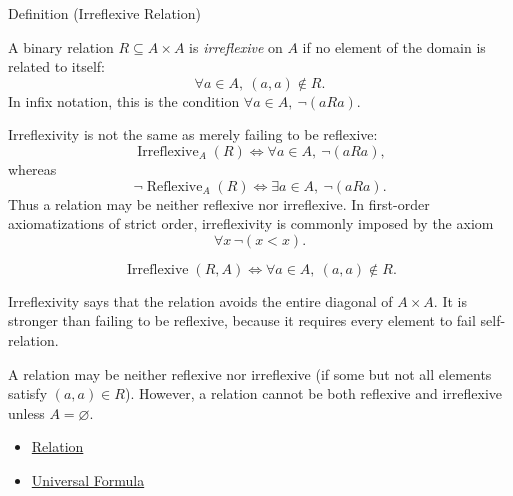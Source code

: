 \begin{definitionbox}{Definition (Irreflexive Relation)}
\begin{definition}\label{def:irreflexive}
A binary relation $R\subseteq A\times A$ is \emph{irreflexive} on $A$ if no
element of the domain is related to itself:
\[
  \forall a\in A,\ (a,a)\notin R.
\]
In infix notation, this is the condition $\forall a\in A,\ \neg(aRa)$.
\end{definition}
\end{definitionbox}


\begin{remark*}
Irreflexivity is not the same as merely failing to be reflexive:
\[
  \operatorname{Irreflexive}_A(R)
  \iff
  \forall a\in A,\ \neg(aRa),
\]
whereas
\[
  \neg\operatorname{Reflexive}_A(R)
  \iff
  \exists a\in A,\ \neg(aRa).
\]
Thus a relation may be neither reflexive nor irreflexive. In first-order
axiomatizations of strict order, irreflexivity is commonly imposed by the
axiom
\[
  \forall x\,\neg(x<x).
\]
\end{remark*}

\begin{remark*}
\[
  \operatorname{Irreflexive}(R,A)
  \iff
  \forall a\in A,\ (a,a)\notin R.
\]
\end{remark*}

\begin{remark*}[Interpretation]
Irreflexivity says that the relation avoids the entire diagonal of
$A\times A$. It is stronger than failing to be reflexive, because it requires
every element to fail self-relation.
\end{remark*}

\begin{remark*}[Exposition]
A relation may be neither reflexive nor irreflexive (if some but not all
elements satisfy $(a,a)\in R$). However, a relation cannot be both reflexive
and irreflexive unless $A = \varnothing$.
\end{remark*}

\begin{dependencies}
\begin{itemize}
  \item \hyperref[def:relation]{Relation}
  \item \hyperref[def:universal-q]{Universal Formula}
\end{itemize}
\end{dependencies}

